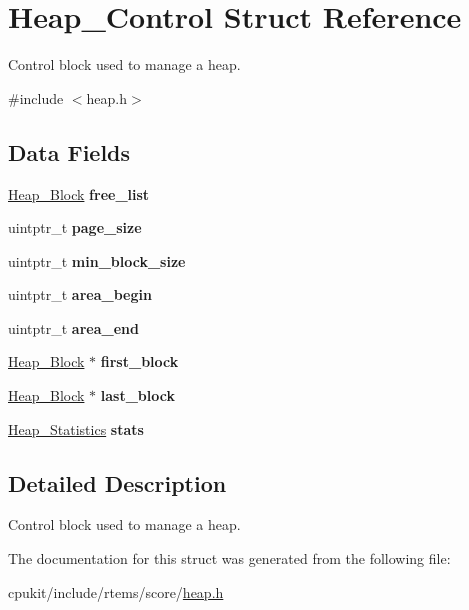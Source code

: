 \hypertarget{structHeap__Control}{}\section{Heap\+\_\+\+Control Struct Reference}
\label{structHeap__Control}


Control block used to manage a heap.  




{\ttfamily \#include $<$heap.\+h$>$}

\subsection*{Data Fields}
\begin{DoxyCompactItemize}
\item 
\mbox{\label{structHeap__Control_a44d2f0f0274c31cd5bd649f5baa4f1ac}} 
\mbox{\hyperlink{structHeap__Block}{Heap\+\_\+\+Block}} {\bfseries free\+\_\+list}
\item 
\mbox{\label{structHeap__Control_a5fb34af0da8947b6df19b879e813f2a6}} 
uintptr\+\_\+t {\bfseries page\+\_\+size}
\item 
\mbox{\label{structHeap__Control_abd392d5631d3cc831d87a8c011a13b45}} 
uintptr\+\_\+t {\bfseries min\+\_\+block\+\_\+size}
\item 
\mbox{\label{structHeap__Control_a4cc4c20bb907fdd023cfcf894fecbe9e}} 
uintptr\+\_\+t {\bfseries area\+\_\+begin}
\item 
\mbox{\label{structHeap__Control_ad66f8b31ca30d999d68657661334a8dc}} 
uintptr\+\_\+t {\bfseries area\+\_\+end}
\item 
\mbox{\label{structHeap__Control_ae6747286231442d14c227760f353afdf}} 
\mbox{\hyperlink{structHeap__Block}{Heap\+\_\+\+Block}} $\ast$ {\bfseries first\+\_\+block}
\item 
\mbox{\label{structHeap__Control_a608a348b5b77900a66a31dc124f1f9af}} 
\mbox{\hyperlink{structHeap__Block}{Heap\+\_\+\+Block}} $\ast$ {\bfseries last\+\_\+block}
\item 
\mbox{\label{structHeap__Control_aabb1eeb95f09cc92c5275483b921e21c}} 
\mbox{\hyperlink{structHeap__Statistics}{Heap\+\_\+\+Statistics}} {\bfseries stats}
\end{DoxyCompactItemize}


\subsection{Detailed Description}
Control block used to manage a heap. 

The documentation for this struct was generated from the following file\+:\begin{DoxyCompactItemize}
\item 
cpukit/include/rtems/score/\mbox{\hyperlink{heap_8h}{heap.\+h}}\end{DoxyCompactItemize}
